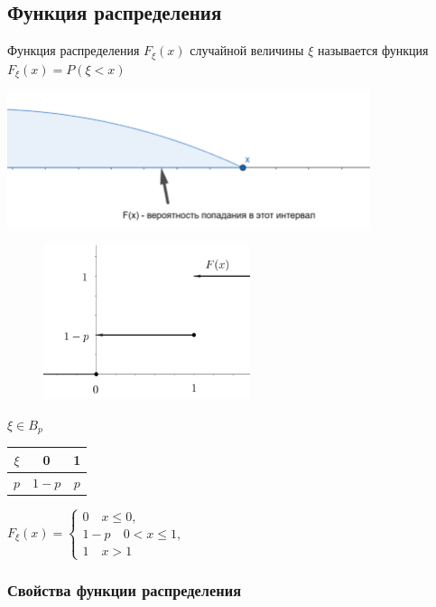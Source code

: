 \documentclass[12pt]{article}
\begin{document}
    \subsection{Функция распределения}

    \Def Функция распределения $F_\xi(x)$ случайной величины $\xi$ называется функция $F_\xi(x) = P(\xi < x)$

    \includegraphics[height=4cm]{probtheory/images/probtheory_2024_10_22_2}

    \begin{minipage}{\textwidth}
        \begin{figure}
            \includegraphics[height=4.5cm]{probtheory/images/probtheory_2024_10_22_3}
        \end{figure}

        \Ex $\xi \in B_p$ \qquad \begin{tabular}{c|c|c}
            $\xi$ & 0 & 1 \\ \hline
            $p$ & $1 - p$ & $p$ \\
        \end{tabular}
        
        $F_\xi(x) = \begin{cases}0 \quad x \leq 0, \\ 1 - p \quad 0 < x \leq 1, \\ 1 \quad x > 1\end{cases}$

    \end{minipage}

    \subsubsection{Свойства функции распределения}
\end{document}
